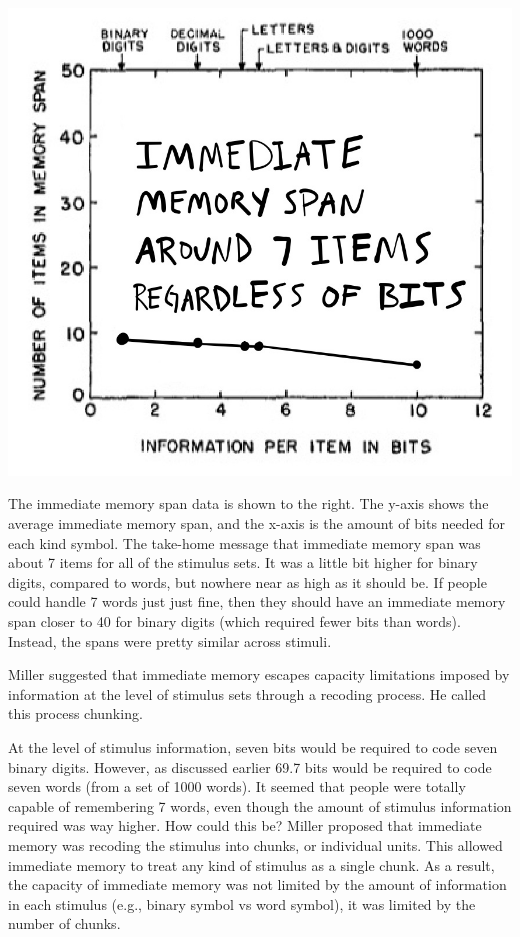 \documentclass[
  oneside,
  12pt]{crumpbook}
\newenvironment{floatright50}{%
  \wrapfigure{R}{.5\textwidth}%
  }{%
  \endwrapfigure}
\begin{document}
\begin{floatright50}
\includegraphics[width=1\linewidth]{imgs/Miller_im_span}

\end{floatright50}

The immediate memory span data is shown to the right. The y-axis shows the average immediate memory span, and the x-axis is the amount of bits needed for each kind symbol. The take-home message that immediate memory span was about 7 items for all of the stimulus sets. It was a little bit higher for binary digits, compared to words, but nowhere near as high as it should be. If people could handle 7 words just just fine, then they should have an immediate memory span closer to 40 for binary digits (which required fewer bits than words). Instead, the spans were pretty similar across stimuli.

Miller suggested that immediate memory escapes capacity limitations imposed by information at the level of stimulus sets through a recoding process. He called this process chunking.

At the level of stimulus information, seven bits would be required to code seven binary digits. However, as discussed earlier 69.7 bits would be required to code seven words (from a set of 1000 words). It seemed that people were totally capable of remembering 7 words, even though the amount of stimulus information required was way higher. How could this be? Miller proposed that immediate memory was recoding the stimulus into chunks, or individual units. This allowed immediate memory to treat any kind of stimulus as a single chunk. As a result, the capacity of immediate memory was not limited by the amount of information in each stimulus (e.g., binary symbol vs word symbol), it was limited by the number of chunks.
\end{document}
